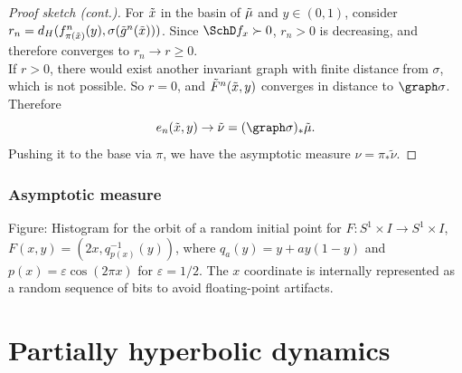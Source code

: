 \documentclass[shortlabels, 9pt, aspectratio=2013]{beamer}
\begin{document}
\begin{frame}
  \begin{proof}[Proof sketch (cont.)]
    For \(\tilde x\) in the basin of \(\tilde \mu\) and \(y \in (0,1)\), consider  \(r_n = d_H(f_{\pi(\tilde x)}^n(y), \sigma(\tilde g^n(\tilde x)))\). Since \(\SchD f_x \succ 0\), \(r_n > 0\) is decreasing, and therefore converges to \(r_n \to r \ge 0\).\\[1em]

    If \(r > 0\), there would exist another invariant graph with finite distance from \(\sigma\), which is not possible. So \(r = 0\), and \(\tilde{F}^n(\tilde x,y)\) converges in distance to \(\graph \sigma\). Therefore \[e_n(\ex, y) \to \enu = (\graph \sigma)_*\tilde \mu.\]
    Pushing it to the base via \(\pi\), we have the asymptotic measure \(\nu = \pi_*\tilde \nu\).
  \end{proof}
\end{frame}

\begin{frame}
  \frametitle{Asymptotic measure}
  \begin{center}
  \end{center}
  \small
  Figure: Histogram for the orbit of a random initial point for \(F \colon S^1 \times I \to S^1 \times I\), \(F(x,y) = (2x, q_{p(x)}^{-1}(y))\), where \(q_a(y) = y + ay(1 - y)\) and \(p(x) = \varepsilon \cos(2 \pi x)\) for \(\varepsilon = 1/2\). The \(x\) coordinate is internally represented as a random sequence of bits to avoid floating-point artifacts.
\end{frame}

\section{Partially hyperbolic dynamics}
\end{document}
